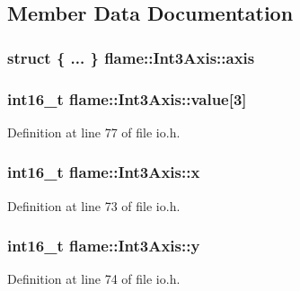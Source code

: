 \subsection{Member Data Documentation}
\hypertarget{unionflame_1_1_int3_axis_a82f911e02da3e252d5efd2dffff63b9d}{
\subsubsection[{axis}]{\setlength{\rightskip}{0pt plus 5cm}struct \{ ... \}   flame\-::\-Int3\-Axis\-::axis}}\label{unionflame_1_1_int3_axis_a82f911e02da3e252d5efd2dffff63b9d}
\hypertarget{unionflame_1_1_int3_axis_a45f54ece82ccc5f3045ba30fe814b912}{
\subsubsection[{value}]{\setlength{\rightskip}{0pt plus 5cm}int16\-\_\-t flame\-::\-Int3\-Axis\-::value\mbox{[}3\mbox{]}}}\label{unionflame_1_1_int3_axis_a45f54ece82ccc5f3045ba30fe814b912}


Definition at line 77 of file io.\-h.

\hypertarget{unionflame_1_1_int3_axis_a5afc91d24e7c9a8e84fd076d01525a44}{
\subsubsection[{x}]{\setlength{\rightskip}{0pt plus 5cm}int16\-\_\-t flame\-::\-Int3\-Axis\-::x}}\label{unionflame_1_1_int3_axis_a5afc91d24e7c9a8e84fd076d01525a44}


Definition at line 73 of file io.\-h.

\hypertarget{unionflame_1_1_int3_axis_a214fbd1192879a9ae9975b819cb7ea9f}{
\subsubsection[{y}]{\setlength{\rightskip}{0pt plus 5cm}int16\-\_\-t flame\-::\-Int3\-Axis\-::y}}\label{unionflame_1_1_int3_axis_a214fbd1192879a9ae9975b819cb7ea9f}


Definition at line 74 of file io.\-h.

